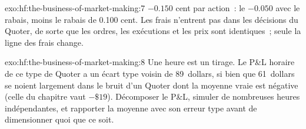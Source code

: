\begin{solution}{exo:hf:the-business-of-market-making:7}
$-0.150$ cent par action~: le $-0.050$ avec le rabais, moins le rabais de 0.100 cent. Les frais n'entrent pas dans les décisions du Quoter, de sorte que les ordres, les exécutions et
les prix sont identiques~; seule la ligne des frais change.
\end{solution}

\begin{solution}{exo:hf:the-business-of-market-making:8}
Une heure est un tirage. Le P\&L horaire de ce type de Quoter a un écart type voisin de 89~dollars, si bien que 61~dollars se noient largement dans le bruit d'un Quoter dont
la moyenne vraie est négative (celle du chapitre vaut $-\$19$). Décomposer le P\&L, simuler de nombreuses heures indépendantes, et rapporter la moyenne avec son erreur type
avant de dimensionner quoi que ce soit.
\end{solution}

